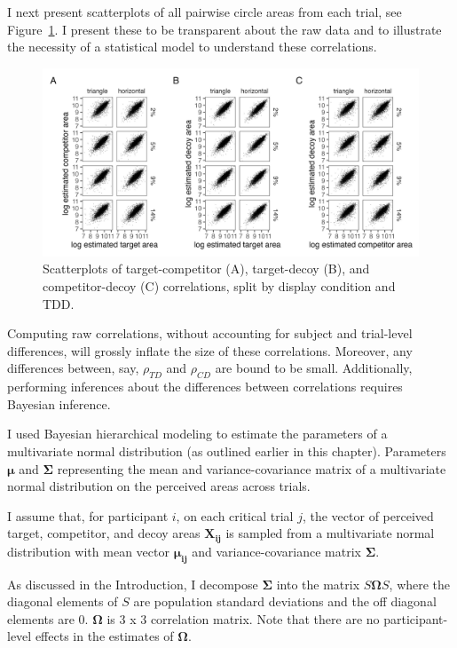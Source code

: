 I next present scatterplots of all pairwise circle areas from each trial, see Figure~\ref{fig:raw_cors}. I present these to be transparent about the raw data and to illustrate the necessity of a statistical model to understand these correlations. 

\begin{figure}
   \includegraphics[width=\textwidth]{figures/circleAreaPhase_cor_plot_all_no_outliers.jpg}
   \caption{Scatterplots of target-competitor (A), target-decoy (B), and competitor-decoy (C) correlations, split by display condition and TDD.}
   \label{fig:raw_cors}
\end{figure}

Computing raw correlations, without accounting for subject and trial-level differences, will grossly inflate the size of these correlations. Moreover, any differences between, say, $\rho_{TD}$ and $\rho_{CD}$ are bound to be small. Additionally, performing inferences about the differences between correlations requires Bayesian inference. 

I used Bayesian hierarchical modeling to estimate the parameters of a multivariate normal distribution (as outlined earlier in this chapter). Parameters $\boldsymbol{\mu}$ and $\boldsymbol{\Sigma}$ representing the mean and variance-covariance matrix of a multivariate normal distribution on the perceived areas across trials. 

I assume that, for participant $i$, on each critical trial $j$, the vector of perceived target, competitor, and decoy areas $\mathbf{X_{ij}}$ is sampled from a multivariate normal distribution with mean vector $\boldsymbol{\mu_{ij}}$ and variance-covariance matrix $\boldsymbol{\Sigma}$. 

As discussed in the Introduction, I decompose $\boldsymbol{\Sigma}$ into the  matrix $S\boldsymbol{\Omega}S$, where the diagonal elements of $S$ are population standard deviations and the off diagonal elements are $0$. $\boldsymbol{\Omega}$ is 3 x 3 correlation matrix. Note that there are no participant-level effects in the estimates of $\boldsymbol{\Omega}$.

